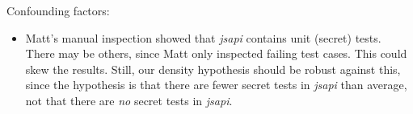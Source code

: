 
Confounding factors:
\begin{itemize}
\item Matt's manual inspection showed that {\em jsapi} contains unit
  (secret) tests. There may be others, since Matt only inspected
  failing test cases. This could skew the results. Still, our density
  hypothesis should be robust against this, since the hypothesis is
  that there are fewer secret tests in {\em jsapi} than average, not
  that there are {\em no} secret tests in {\em jsapi}.
\end{itemize}
